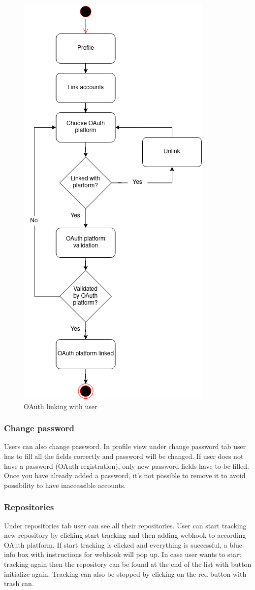 \begin{figure}[H]
    \centering
    \includegraphics[width=0.5\linewidth]{figures/oauth_linking_user_flow}
    \caption{OAuth linking with user}
    \label{fig:account-linking}
\end{figure}

\subsubsection{Change password}\label{subsubsec:change-password}
Users can also change password.
In profile view under change password tab user has to fill all the fields correctly and password will be changed.
If user does not have a password (OAuth registration), only new password fields have to be filled.
Once you have already added a password, it's not possible to remove it to avoid possibility to have inaccessible accounts.

\subsubsection{Repositories}\label{subsubsec:repositories}
Under repositories tab user can see all their repositories.
User can start tracking new repository by clicking start tracking and then adding webhook to according OAuth platform.
If start tracking is clicked and everything is successful, a blue info box with instructions for webhook will pop up.
In case user wants to start tracking again then the repository can be found at the end of the list with button initialize again.
Tracking can also be stopped by clicking on the red button with trash can.

